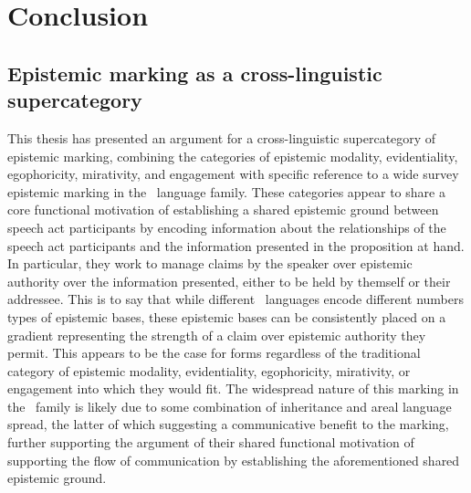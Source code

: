 \chapter{Conclusion}\label{c:Conclusion}
\section{Epistemic marking as a cross-linguistic supercategory}
This thesis has presented an argument for a cross-linguistic supercategory of epistemic marking, combining the categories of epistemic modality, evidentiality, egophoricity, mirativity, and engagement with specific reference to a wide survey epistemic marking in the \lfam\ language family. These categories appear to share a core functional motivation of establishing a shared epistemic ground between speech act participants by encoding information about the relationships of the speech act participants and the information presented in the proposition at hand. In particular, they work to manage claims by the speaker over epistemic authority over the information presented, either to be held by themself or their addressee. This is to say that while different \lfam\ languages encode different numbers types of epistemic bases, these epistemic bases can be consistently placed on a gradient representing the strength of a claim over epistemic authority they permit. This appears to be the case for forms regardless of the traditional category of epistemic modality, evidentiality, egophoricity, mirativity, or engagement into which they would fit. The widespread nature of this marking in the \lfam\ family is likely due to some combination of inheritance and areal language spread, the latter of which suggesting a communicative benefit to the marking, further supporting the argument of their shared functional motivation of supporting the flow of communication by establishing the aforementioned shared epistemic ground.

